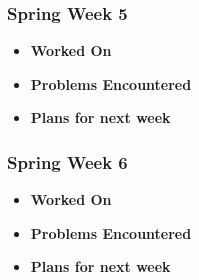 \documentclass[compsoc,draftclsnofoot,onecolumn,10pt]{IEEEtran}
\begin{document}
\subsubsection{Spring Week 5}
\begin{itemize}
    \item {\textbf{Worked On}}
    \begin{itemize}

    \end{itemize}

    \item {\textbf{Problems Encountered}}
    \begin{itemize}

    \end{itemize}

    \item{\textbf{Plans for next week}}
    \begin{itemize}

    \end{itemize}

\end{itemize}

\subsubsection{Spring Week 6}
\begin{itemize}
    \item {\textbf{Worked On}}
    \begin{itemize}

    \end{itemize}

    \item {\textbf{Problems Encountered}}
    \begin{itemize}

    \end{itemize}

    \item{\textbf{Plans for next week}}
    \begin{itemize}

    \end{itemize}

\end{itemize}
\end{document}
